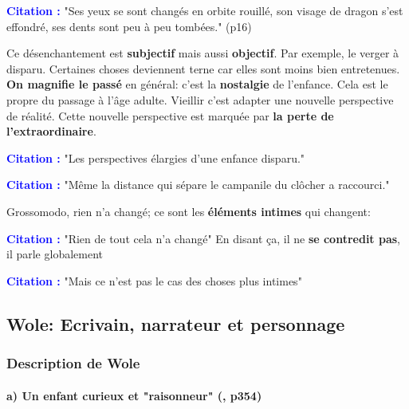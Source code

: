 \documentclass[a4paper, 11pt, hidelinks]{article}
\newcommand{\bs}{\bigskip}
\newcommand{\cit}{\large \textcolor{blue}{\textbf{Citation :}} \large }
\newcommand{\rb}[1]{\Romanbar{#1}}
\begin{document}
\cit "Ses yeux se sont changés en orbite rouillé, son visage de dragon s'est effondré, ses dents sont peu à peu tombées." (p16)


\bs

Ce désenchantement est \textbf{subjectif} mais aussi \textbf{objectif}. Par exemple, le verger à disparu. Certaines choses deviennent terne car elles sont
moins bien entretenues. \textbf{On magnifie le passé} en général: c'est la \textbf{nostalgie} de l'enfance. Cela est le propre du passage
à l'âge adulte. Vieillir c'est adapter une nouvelle perspective de réalité. Cette nouvelle perspective est marquée par \textbf{la perte de l'extraordinaire}.

\bs
\cit "Les perspectives élargies d'une enfance disparu."


\cit "Même la distance qui sépare le campanile du clôcher a raccourci."

\bs
Grossomodo, rien n'a changé; ce sont les \textbf{éléments intimes} qui changent:


\cit "Rien de tout cela n'a changé" En disant ça, il ne \textbf{se contredit pas}, il parle globalement


\cit "Mais ce n'est pas le cas des choses plus intimes"







\subsection{Wole: Ecrivain, narrateur et personnage}
\subsubsection{Description de Wole}


\paragraph{a) Un enfant curieux et "raisonneur" (\rb{13}, p354)}
\end{document}
